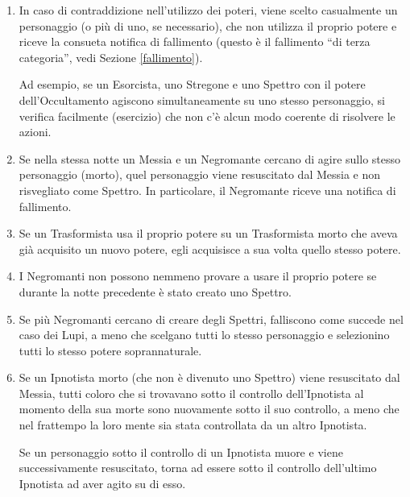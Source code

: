 \documentclass[a4paper,10pt]{article}
\begin{document}
\begin{enumerate}
 
 \item In caso di contraddizione nell'utilizzo dei poteri, viene scelto casualmente un personaggio (o più di uno, se necessario), che non utilizza il proprio potere e riceve la consueta notifica di fallimento (questo è il fallimento ``di terza categoria'', vedi Sezione \ref{fallimento}).
 
 Ad esempio, se un Esorcista, uno Stregone e uno Spettro con il potere dell'Occultamento agiscono simultaneamente su uno stesso personaggio, si verifica facilmente (esercizio) che non c'è alcun modo coerente di risolvere le azioni.
  
 \item Se nella stessa notte un Messia e un Negromante cercano di agire sullo stesso personaggio (morto), quel personaggio viene resuscitato dal Messia e non risvegliato come Spettro. In particolare, il Negromante riceve una notifica di fallimento.

 \item Se un Trasformista usa il proprio potere su un Trasformista morto che aveva già acquisito un nuovo potere, egli acquisisce a sua volta quello stesso potere.
 
 \item I Negromanti non possono nemmeno provare a usare il proprio potere se durante la notte precedente è stato creato uno Spettro.
 
 \item Se più Negromanti cercano di creare degli Spettri, falliscono come succede nel caso dei Lupi, a meno che scelgano tutti lo stesso personaggio e selezionino tutti lo stesso potere soprannaturale.

 \item Se un Ipnotista morto (che non è divenuto uno Spettro) viene resuscitato dal Messia, tutti coloro che si trovavano sotto il controllo dell'Ipnotista al momento della sua morte sono nuovamente sotto il suo controllo, a meno che nel frattempo la loro mente sia stata controllata da un altro Ipnotista.
 
 Se un personaggio sotto il controllo di un Ipnotista muore e viene successivamente resuscitato, torna ad essere sotto il controllo dell'ultimo Ipnotista ad aver agito su di esso.
 

\end{enumerate}
\end{document}
